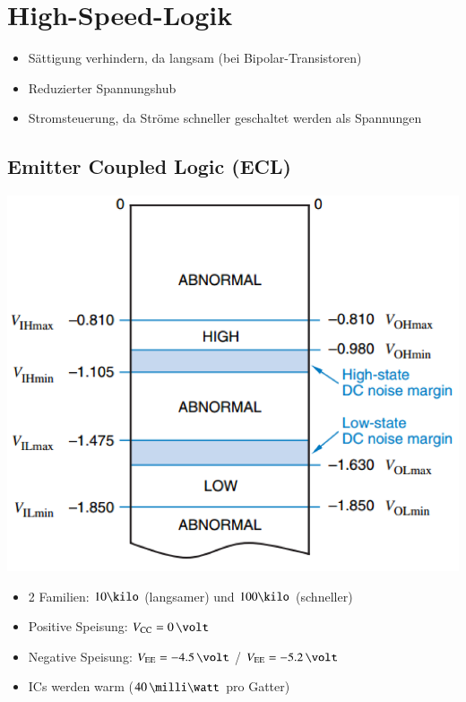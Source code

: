 \section{High-Speed-Logik}

\begin{itemize}
    \item Sättigung verhindern, da langsam (bei Bipolar-Transistoren)
    \item Reduzierter Spannungshub
    \item Stromsteuerung, da Ströme schneller geschaltet werden als Spannungen
\end{itemize}


\subsection{Emitter Coupled Logic (ECL)}


\begin{minipage}[c]{0.3\columnwidth}
    \includegraphics[width=\columnwidth]{images/ECL_logikpegel.png}
\end{minipage}
\hfill
\begin{minipage}[c]{0.68\columnwidth}
    \begin{itemize}
        \item 2 Familien: $10 \kilo$ (langsamer) und $100 \kilo$ (schneller)
        \item Positive Speisung: $V_{\rm CC} = 0 \, \volt$
        \item Negative Speisung: $V_{\rm EE} = -4.5 \, \volt$ / $V_{\rm EE} = -5.2 \, \volt$ 
        \item ICs werden warm ($40 \, \milli \watt$ pro Gatter)
    \end{itemize}
\end{minipage}

